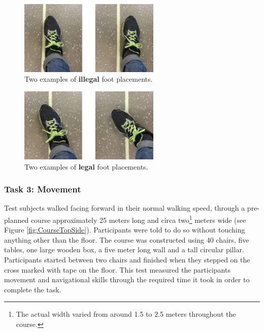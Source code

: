 \documentclass[runningheads,a4paper,oribibl]{llncs}
\begin{document}
\begin{figure}
   \centering
   \includegraphics[width=0.6\textwidth]{ExternalMaterial/Illegal}
   \caption{Two examples of \textbf{illegal} foot placements.} \label{fig:Illegal}
\end{figure}
\begin{figure}
   \centering
   \includegraphics[width=0.6\textwidth]{ExternalMaterial/Legal}
   \caption{Two examples of \textbf{legal} foot placements.} \label{fig:Legal}
\end{figure}



\subsubsection{Task 3: Movement}

Test subjects walked facing forward in their normal walking speed, through a pre-planned course approximately 25 meters long and circa two\footnote{The actual width varied from around 1.5 to 2.5 meters throughout the course.} meters wide (see Figure \ref{fig:CourseTopSide}). Participants were told to do so without touching anything other than the floor. The course was constructed using 40 chairs, five tables, one large wooden box, a five meter long wall and a tall circular pillar. Participants started between two chairs and finished when they stepped on the cross marked with tape on the floor. This test measured the participants movement and navigational skills through the required time it took in order to complete the task. 
\end{document}
